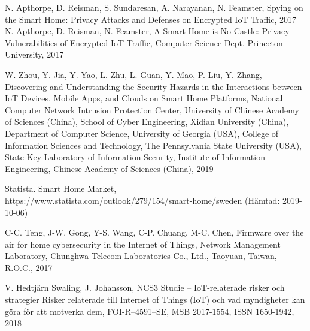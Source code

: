 \documentclass[conference]{IEEEtran}
\begin{document}
%
%
%
\begin{thebibliography}{1}


N. Apthorpe, D. Reisman, S. Sundaresan, A. Narayanan, N. Feamster, Spying on the Smart Home: Privacy Attacks and Defenses on Encrypted IoT Traffic, 2017
N. Apthorpe, D. Reisman, N. Feamster, A Smart Home is No Castle: Privacy Vulnerabilities of Encrypted IoT Traffic, Computer Science Dept. Princeton University, 2017
  
W. Zhou, Y. Jia, Y. Yao, L. Zhu, L. Guan, Y. Mao, P. Liu, Y. Zhang, Discovering and Understanding the Security Hazards in the Interactions between IoT Devices, Mobile Apps, and Clouds on Smart Home Platforms, National Computer Network Intrusion Protection Center, University of Chinese Academy of Sciences (China), School of Cyber Engineering, Xidian University (China), Department of Computer Science, University of Georgia (USA),  College of Information Sciences and Technology, The Pennsylvania State University (USA), State Key Laboratory of Information Security, Institute of Information Engineering, Chinese Academy of Sciences (China), 2019

Statista. Smart Home Market, https://www.statista.com/outlook/279/154/smart-home/sweden (Hämtad: 2019-10-06)
  
C-C. Teng, J-W. Gong, Y-S. Wang, C-P. Chuang, M-C. Chen, Firmware over the air for home cybersecurity in the Internet of Things, Network Management Laboratory, Chunghwa Telecom Laboratories Co., Ltd., Taoyuan, Taiwan, R.O.C., 2017
  
V. Hedtjärn Swaling, J. Johansson, NCS3 Studie – IoT-relaterade risker och strategier Risker relaterade till Internet of Things (IoT) och vad myndigheter kan göra för att motverka dem, FOI-R--4591--SE, MSB 2017-1554, ISSN 1650-1942, 2018
  

\end{thebibliography}
\end{document}
